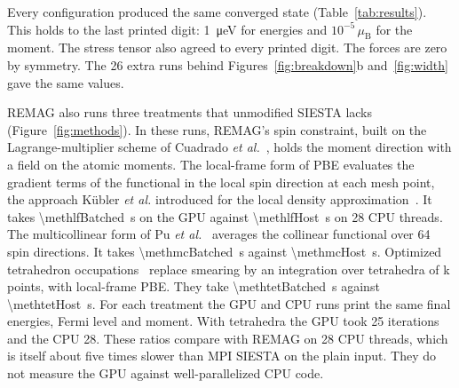 Every configuration produced the same converged state (Table~\ref{tab:results}). This
holds to the last printed digit: \SI{1}{\micro eV} for energies and $10^{-5}\,\mu_\mathrm{B}$
for the moment. The stress tensor also agreed to every printed digit. The forces are zero
by symmetry. The 26 extra runs behind Figures~\ref{fig:breakdown}b and~\ref{fig:width}
gave the same values.

REMAG also runs three treatments that unmodified SIESTA lacks (Figure~\ref{fig:methods}).
In these runs, REMAG's spin constraint, built on the Lagrange-multiplier scheme of
Cuadrado \textit{et al.}~\citep{Cuadrado2018}, holds the moment direction with a field on the
atomic moments. The local-frame form of PBE evaluates the gradient terms of the functional
in the local spin direction at each mesh point, the approach Kübler \textit{et al.}
introduced for the local density approximation~\citep{Kubler1988}. It takes \SI{\methlfBatched}{s} on the GPU
against \SI{\methlfHost}{s} on 28 CPU threads. The multicollinear form of Pu \textit{et al.}~\citep{Pu2023} averages the
collinear functional over 64 spin directions. It takes \SI{\methmcBatched}{s} against
\SI{\methmcHost}{s}. Optimized tetrahedron occupations~\citep{Kawamura2014} replace smearing by an integration
over tetrahedra of k points, with local-frame PBE. They take \SI{\methtetBatched}{s}
against \SI{\methtetHost}{s}. For each treatment the GPU and CPU runs print the same final
energies, Fermi level and moment. With tetrahedra the GPU took 25 iterations and the CPU
28. These ratios compare with REMAG on 28 CPU threads, which is itself about five times
slower than MPI SIESTA on the plain input. They do not measure the GPU against
well-parallelized CPU code.
